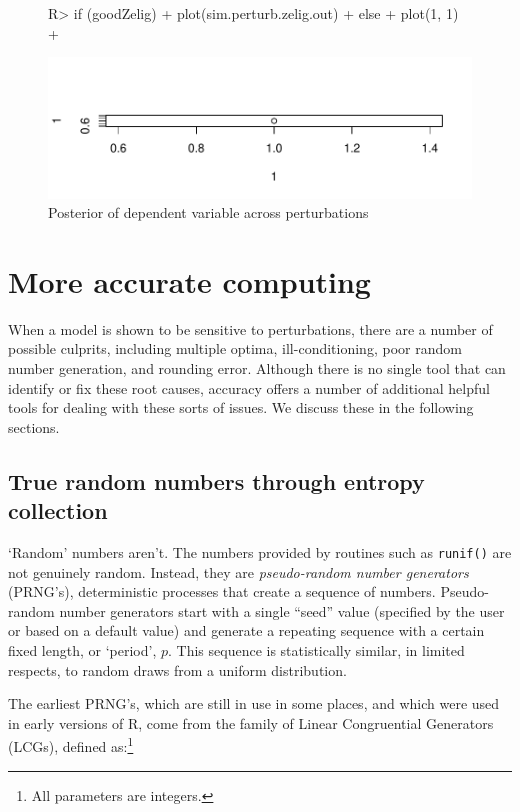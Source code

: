 \documentclass[11pt]{article}
\let\code=\texttt
\newcommand{\pkg}[1]{{\normalfont\fontseries{b}\selectfont #1}}
\begin{document}
\begin{figure}
\begin{Schunk}
\begin{Sinput}
R> if (goodZelig) {
+     plot(sim.perturb.zelig.out)
+ } else {
+     plot(1, 1)
+ }
\end{Sinput}
\end{Schunk}
\includegraphics{accuracy_vignette-plot2a}
\caption{\label{fig:plot2} Posterior of dependent variable across perturbations}
\end{figure}


\section{More accurate computing} 

When a model is shown to be sensitive to perturbations, there are a number of possible culprits, including multiple optima, ill-conditioning, poor random number generation, and rounding error. Although there is no single tool that can identify or fix these root causes, \pkg{accuracy} offers a number of additional helpful tools for dealing with these sorts of issues. We discuss these in the following sections. 

\subsection{True random numbers through entropy collection}

`Random' numbers aren't. The numbers provided by routines such as \code{runif()} are not genuinely random.
 Instead, they are \emph{pseudo-random number generators}
(PRNG's), deterministic processes that create a sequence of numbers. 
Pseudo-random number generators start with a single ``seed'' value (specified by the user or based on a default value)
 and generate a repeating sequence with a certain
fixed length, or `period', $p$. This sequence is statistically
similar, in limited respects, to random draws from a uniform
distribution.

The earliest PRNG's, which are still in use in some places, and which were used in early versions of R, come 
from the family of Linear Congruential Generators (LCGs), defined 
	as:\footnote{All parameters are integers.}
\end{document}
